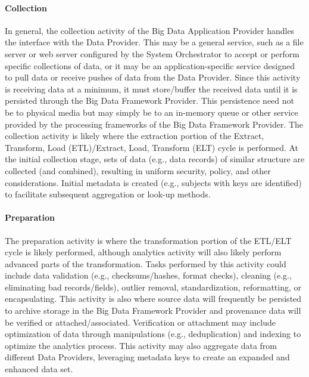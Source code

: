 \documentclass[9pt,]{article}
\let\oldparagraph\paragraph
\renewcommand{\paragraph}[1]{\oldparagraph{#1}\mbox{}}
\begin{document}
\hypertarget{collection}{%
\paragraph{Collection}\label{collection}}

In general, the collection activity of the Big Data Application Provider
handles the interface with the Data Provider. This may be a general
service, such as a file server or web server configured by the System
Orchestrator to accept or perform specific collections of data, or it
may be an application-specific service designed to pull data or receive
pushes of data from the Data Provider. Since this activity is receiving
data at a minimum, it must store/buffer the received data until it is
persisted through the Big Data Framework Provider. This persistence need
not be to physical media but may simply be to an in-memory queue or
other service provided by the processing frameworks of the Big Data
Framework Provider. The collection activity is likely where the
extraction portion of the Extract, Transform, Load (ETL)/Extract, Load,
Transform (ELT) cycle is performed. At the initial collection stage,
sets of data (e.g., data records) of similar structure are collected
(and combined), resulting in uniform security, policy, and other
considerations. Initial metadata is created (e.g., subjects with keys
are identified) to facilitate subsequent aggregation or look-up methods.

\hypertarget{preparation}{%
\paragraph{Preparation}\label{preparation}}

The preparation activity is where the transformation portion of the
ETL/ELT cycle is likely performed, although analytics activity will also
likely perform advanced parts of the transformation. Tasks performed by
this activity could include data validation (e.g., checksums/hashes,
format checks), cleaning (e.g., eliminating bad records/fields),
outlier removal, standardization, reformatting, or encapsulating. This
activity is also where source data will frequently be persisted to
archive storage in the Big Data Framework Provider and provenance data
will be verified or attached/associated. Verification or attachment may
include optimization of data through manipulations (e.g., deduplication)
and indexing to optimize the analytics process. This activity may also
aggregate data from different Data Providers, leveraging metadata keys
to create an expanded and enhanced data set.
\end{document}
